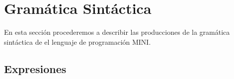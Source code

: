 
\section{Gramática Sintáctica}

En esta sección procederemos a describir las producciones de la gramática sintáctica de el lenguaje de programación MINI.

\subsection{Expresiones}
